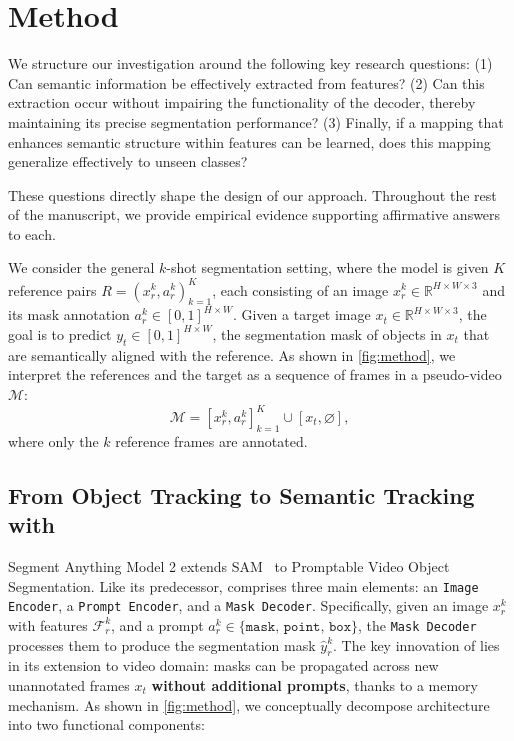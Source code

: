 
\section{Method}
We structure our investigation around the following key research questions: (1) Can semantic information be effectively extracted from \sam{} features? (2) Can this extraction occur without impairing the functionality of the \sam{} decoder, thereby maintaining its precise segmentation performance? (3) Finally, if a mapping that enhances semantic structure within \sam{} features can be learned, does this mapping generalize effectively to unseen classes?

These questions directly shape the design of our approach. Throughout the rest of the manuscript, we provide empirical evidence supporting affirmative answers to each.

\label{sec:semantic}
We consider the general $k$-shot segmentation setting, where the model is given $K$ reference pairs $R = {(x_r^k, a_r^k)}^K_{k=1}$, each consisting of an image $x_r^k \in \mathbb{R}^{H \times W \times 3}$ and its mask annotation $a_r^k \in [0,1]^{H \times W}$. Given a target image $x_t \in \mathbb{R}^{H \times W \times 3}$, the goal is to predict $y_t \in [0,1]^{H \times W}$, the segmentation mask of objects in $x_t$ that are semantically aligned with the reference. 
As shown in \cref{fig:method}, we interpret the references and the target as a sequence of frames in a pseudo-video $\mathcal{M}$:
\begin{equation}
    \mathcal{M} = [x^k_r, a^k_r]^K_{k=1} \cup [x_t, \varnothing],
\end{equation}
where only the $k$ reference frames are annotated. 

\subsection{From Object Tracking to Semantic Tracking with \sam{}}
\label{sec:preliminaries}


Segment Anything Model 2 extends SAM~\cite{kirillov2023segment} to Promptable Video Object Segmentation. Like its predecessor, \sam{} comprises three main elements: an \texttt{Image Encoder}, a \texttt{Prompt Encoder}, and a \texttt{Mask Decoder}.
Specifically, given an image $x_r^k$ with features $\mathcal{F}_r^k$, and a prompt $a_r^k \in \big\{ \texttt{mask, point, box} \big\}$, the \texttt{Mask Decoder} processes them to produce the segmentation mask $\hat{y}_r^k$. The key innovation of \sam{} lies in its extension to video domain: masks can be propagated across new unannotated frames $x_t$ \textbf{without additional prompts}, thanks to a memory mechanism.
As shown in \cref{fig:method}, we conceptually decompose \sam{} architecture into two functional components:

